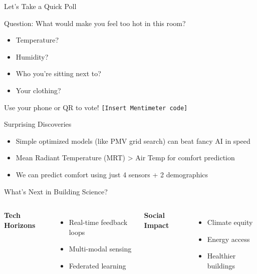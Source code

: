 \documentclass{beamer}
\begin{document}

\begin{frame}{Let’s Take a Quick Poll}
  \begin{block}{Question: What would make you feel too hot in this room?}
    \begin{itemize}
      \item Temperature?
      \item Humidity?
      \item Who you’re sitting next to?
      \item Your clothing?
    \end{itemize}
    \vspace{1em}
    Use your phone or QR to vote! \texttt{[Insert Mentimeter code]}
  \end{block}
\end{frame}


\begin{frame}{Surprising Discoveries}
  \begin{itemize}
    \item Simple optimized models (like PMV grid search) can beat fancy AI in speed
    \item Mean Radiant Temperature (MRT) > Air Temp for comfort prediction
    \item We can predict comfort using just 4 sensors + 2 demographics
  \end{itemize}
\end{frame}

\begin{frame}{What’s Next in Building Science?}
  \begin{columns}
    \textbf{Tech Horizons}
    \begin{itemize}
      \item Real-time feedback loops
      \item Multi-modal sensing
      \item Federated learning
    \end{itemize}
    \textbf{Social Impact}
    \begin{itemize}
      \item Climate equity
      \item Energy access
      \item Healthier buildings
    \end{itemize}
  \end{columns}
\end{frame}
\end{document}
